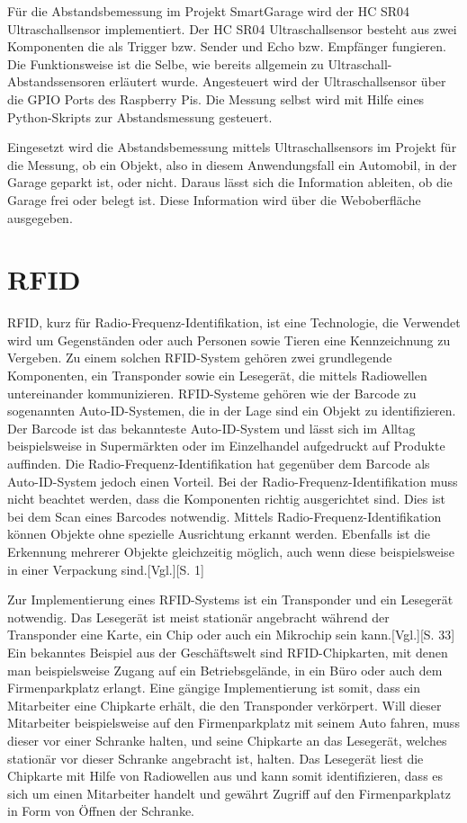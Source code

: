 Für die Abstandsbemessung im Projekt SmartGarage wird der HC SR04 Ultraschallsensor implementiert. Der HC SR04 Ultraschallsensor besteht aus zwei Komponenten die als Trigger bzw. Sender und Echo bzw. Empfänger fungieren. Die Funktionsweise ist die Selbe, wie bereits allgemein zu Ultraschall-Abstandssensoren erläutert wurde. Angesteuert wird der Ultraschallsensor über die GPIO Ports des Raspberry Pis. Die Messung selbst wird mit Hilfe eines Python-Skripts zur Abstandsmessung gesteuert. 

Eingesetzt wird die Abstandsbemessung mittels Ultraschallsensors im Projekt für die Messung, ob ein Objekt, also in diesem Anwendungsfall ein Automobil, in der Garage geparkt ist, oder nicht. Daraus lässt sich die Information ableiten, ob die Garage frei oder belegt ist. Diese Information wird über die Weboberfläche ausgegeben.




\section{RFID}
RFID, kurz für Radio-Frequenz-Identifikation, ist eine Technologie, die Verwendet wird um Gegenständen oder auch Personen sowie Tieren eine Kennzeichnung zu Vergeben. Zu einem solchen RFID-System gehören zwei grundlegende Komponenten, ein Transponder sowie ein Lesegerät, die mittels Radiowellen untereinander kommunizieren. RFID-Systeme gehören wie der Barcode zu sogenannten Auto-ID-Systemen, die in der Lage sind ein Objekt zu identifizieren. Der Barcode ist das bekannteste Auto-ID-System und lässt sich im Alltag beispielsweise in Supermärkten oder im Einzelhandel aufgedruckt auf Produkte auffinden. Die Radio-Frequenz-Identifikation hat gegenüber dem Barcode als Auto-ID-System jedoch einen Vorteil. Bei der Radio-Frequenz-Identifikation muss nicht beachtet werden, dass die Komponenten richtig ausgerichtet sind. Dies ist bei dem Scan eines Barcodes notwendig. Mittels Radio-Frequenz-Identifikation können Objekte ohne spezielle Ausrichtung erkannt werden. Ebenfalls ist die Erkennung mehrerer Objekte gleichzeitig möglich, auch wenn diese beispielsweise in einer Verpackung sind.\autocite{rfid}[Vgl.][S. 1]

Zur Implementierung eines RFID-Systems ist ein Transponder und ein Lesegerät notwendig. Das Lesegerät ist meist stationär angebracht während der Transponder eine Karte, ein Chip oder auch ein Mikrochip sein kann.\autocite{rfid}[Vgl.][S. 33] Ein bekanntes Beispiel aus der Geschäftswelt sind RFID-Chipkarten, mit denen man beispielsweise Zugang auf ein Betriebsgelände, in ein Büro oder auch dem Firmenparkplatz erlangt. Eine gängige Implementierung ist somit, dass ein Mitarbeiter eine Chipkarte erhält, die den Transponder verkörpert. Will dieser Mitarbeiter beispielsweise auf den Firmenparkplatz mit seinem Auto fahren, muss dieser vor einer Schranke halten, und seine Chipkarte an das Lesegerät, welches stationär vor dieser Schranke angebracht ist, halten. Das Lesegerät liest die Chipkarte mit Hilfe von Radiowellen aus und kann somit identifizieren, dass es sich um einen Mitarbeiter handelt und gewährt Zugriff auf den Firmenparkplatz in Form von Öffnen der Schranke.

